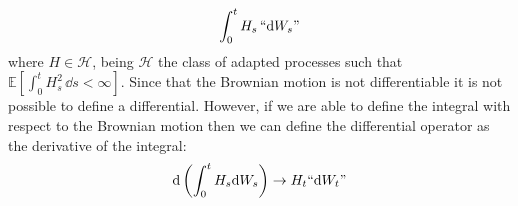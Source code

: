 \begin{equation*}
    \int_0^t H_s\,``\dd W_s"
\end{equation*}
where $H\in\mathcal{H}$, being $\mathcal{H}$ the class of adapted processes such that $\mathbb{E}[\int_0^t H^2_s\,\dd s<\infty]$.
Since that the Brownian motion is not differentiable it is not possible to define a differential. However, if we are able to define the integral with respect to the Brownian motion then we can define the differential operator as the derivative of the integral:
\begin{equation*}
    \dd\left(\int^t_0 H_s \dd W_s\right) \to H_t``\dd W_t"
\end{equation*}

